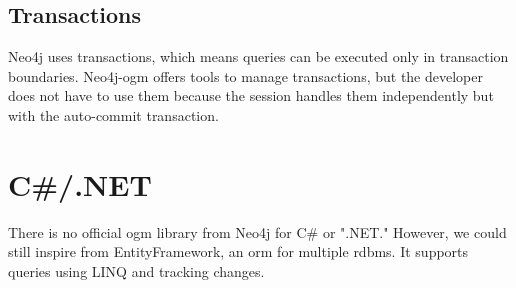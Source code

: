 \subsection{Transactions}

Neo4j uses transactions, which means queries can be executed only in transaction boundaries. Neo4j-\acrshort{ogm}
offers tools to manage transactions, but the developer does not have to use them because the session handles them independently but with the auto-commit transaction.

\section {C\#/.NET}

There is no official \acrshort{ogm} library from Neo4j for C\# or ".NET."
However, we could still inspire from EntityFramework,
an \acrshort{orm} for multiple \acrshort{rdbms}. It supports queries using LINQ and tracking changes. \cite{wadepickett_entity_nodate}
